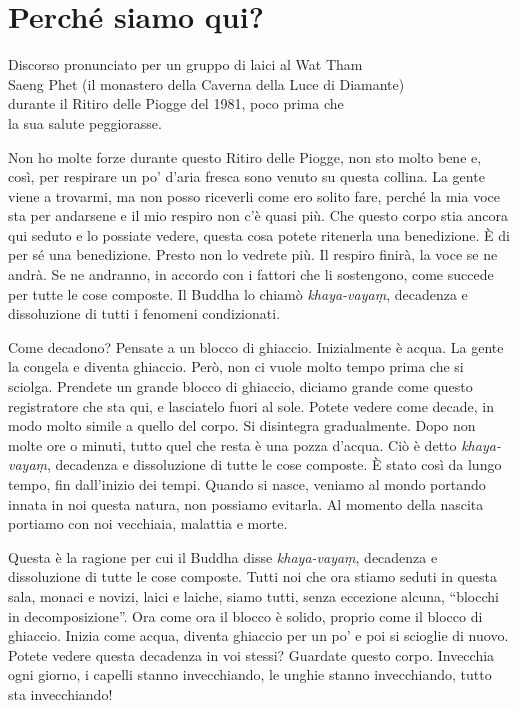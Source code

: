 \chapter{Perché siamo qui?}

\begin{openingQuote}
  \centering

  Discorso pronunciato per un gruppo di laici al Wat Tham\\
  Saeng Phet (il monastero della Caverna della Luce di Diamante)\\
  durante il Ritiro delle Piogge del 1981, poco prima che\\
  la sua salute peggiorasse.
\end{openingQuote}

Non ho molte forze durante questo Ritiro delle Piogge, non sto molto
bene e, così, per respirare un po' d'aria fresca sono venuto su questa
collina. La gente viene a trovarmi, ma non posso riceverli come ero
solito fare, perché la mia voce sta per andarsene e il mio respiro non
c'è quasi più. Che questo corpo stia ancora qui seduto e lo possiate
vedere, questa cosa potete ritenerla una benedizione. È di per sé una
benedizione. Presto non lo vedrete più. Il respiro finirà, la voce se ne
andrà. Se ne andranno, in accordo con i fattori che li sostengono, come
succede per tutte le cose composte. Il Buddha lo chiamò
\emph{khaya-vayaṃ}, decadenza e dissoluzione di tutti i fenomeni
condizionati.

Come decadono? Pensate a un blocco di ghiaccio. Inizialmente è acqua. La
gente la congela e diventa ghiaccio. Però, non ci vuole molto tempo
prima che si sciolga. Prendete un grande blocco di ghiaccio, diciamo
grande come questo registratore che sta qui, e lasciatelo fuori al sole.
Potete vedere come decade, in modo molto simile a quello del corpo. Si
disintegra gradualmente. Dopo non molte ore o minuti, tutto quel che
resta è una pozza d'acqua. Ciò è detto \emph{khaya-vayaṃ}, decadenza e
dissoluzione di tutte le cose composte. È stato così da lungo tempo, fin
dall'inizio dei tempi. Quando si nasce, veniamo al mondo portando innata
in noi questa natura, non possiamo evitarla. Al momento della nascita
portiamo con noi vecchiaia, malattia e morte.

Questa è la ragione per cui il Buddha disse \emph{khaya-vayaṃ},
decadenza e dissoluzione di tutte le cose composte. Tutti noi che ora
stiamo seduti in questa sala, monaci e novizi, laici e laiche, siamo
tutti, senza eccezione alcuna, ``blocchi in decomposizione''. Ora come
ora il blocco è solido, proprio come il blocco di ghiaccio. Inizia come
acqua, diventa ghiaccio per un po' e poi si scioglie di nuovo. Potete
vedere questa decadenza in voi stessi? Guardate questo corpo. Invecchia
ogni giorno, i capelli stanno invecchiando, le unghie stanno
invecchiando, tutto sta invecchiando!

